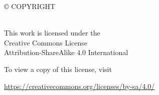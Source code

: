\documentclass[10pt]{report}
\begin{document}

\doublespacing

\thispagestyle{empty} %
\setcounter{page}{2}

\vspace*{\fill}

\begin{flushleft}
\mytitle

\copyright \space
COPYRIGHT

\myyear

\myauthorfull\\[24 pt] %

This work is licensed under the \\
Creative Commons License \\
Attribution-ShareAlike 4.0 International

To view a copy of this license, visit

\url{https://creativecommons.org/licenses/by-sa/4.0/}

\end{flushleft}
\pagebreak
\end{document}
